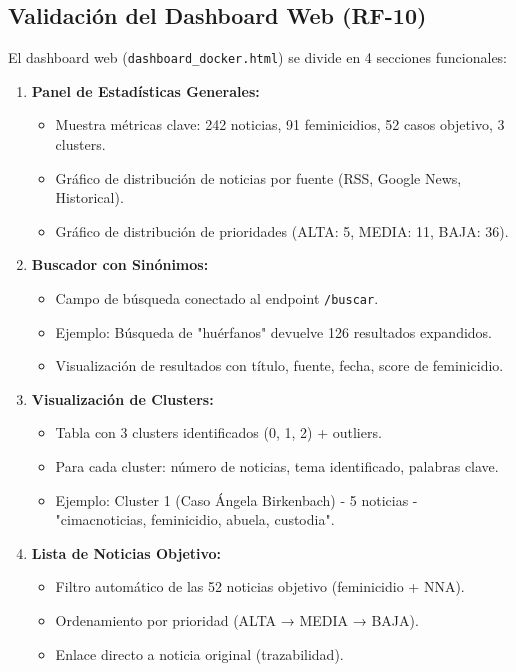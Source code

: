 \subsection{Validación del Dashboard Web (RF-10)}
\label{subsec:resultados_dashboard}

El dashboard web (\texttt{dashboard\_docker.html}) se divide en 4 secciones funcionales:

\begin{enumerate}
    \item \textbf{Panel de Estadísticas Generales:}
    \begin{itemize}
        \item Muestra métricas clave: 242 noticias, 91 feminicidios, 52 casos objetivo, 3 clusters.
        \item Gráfico de distribución de noticias por fuente (RSS, Google News, Historical).
        \item Gráfico de distribución de prioridades (ALTA: 5, MEDIA: 11, BAJA: 36).
    \end{itemize}
    
    \item \textbf{Buscador con Sinónimos:}
    \begin{itemize}
        \item Campo de búsqueda conectado al endpoint \texttt{/buscar}.
        \item Ejemplo: Búsqueda de "huérfanos" devuelve 126 resultados expandidos.
        \item Visualización de resultados con título, fuente, fecha, score de feminicidio.
    \end{itemize}
    
    \item \textbf{Visualización de Clusters:}
    \begin{itemize}
        \item Tabla con 3 clusters identificados (0, 1, 2) + outliers.
        \item Para cada cluster: número de noticias, tema identificado, palabras clave.
        \item Ejemplo: Cluster 1 (Caso Ángela Birkenbach) - 5 noticias - "cimacnoticias, feminicidio, abuela, custodia".
    \end{itemize}
    
    \item \textbf{Lista de Noticias Objetivo:}
    \begin{itemize}
        \item Filtro automático de las 52 noticias objetivo (feminicidio + NNA).
        \item Ordenamiento por prioridad (ALTA → MEDIA → BAJA).
        \item Enlace directo a noticia original (trazabilidad).
    \end{itemize}
\end{enumerate}

